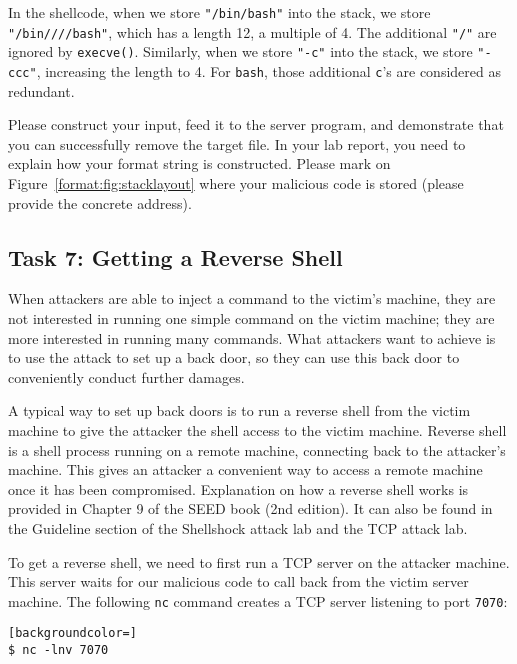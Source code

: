 In the shellcode, when we store \texttt{"/bin/bash"} into the stack, we store 
\texttt{"/bin////bash"}, which has a length 12, a multiple of 4. The additional \texttt{"/"}
are ignored by \texttt{execve()}. Similarly, when we store \texttt{"-c"} into the stack,
we store \texttt{"-ccc"}, increasing the length to 4. For \texttt{bash}, those 
additional \texttt{c}'s are considered as redundant.  


Please construct your input, feed it to the server program, and demonstrate that you can
successfully remove the target file. In your lab report, you need to explain
how your format string is constructed. Please mark on Figure~\ref{format:fig:stacklayout} where 
your malicious code is stored (please provide the concrete address). 


\subsection{Task 7: Getting a Reverse Shell}

When attackers are able to inject a command to the victim's machine, 
they are not interested in running one simple
command on the victim machine; they are more interested in running many
commands. What attackers want to achieve is to use the
attack to set up a back door, so they can use this
back door to conveniently conduct further damages.

A typical way to set up back doors is to run a reverse shell from the
victim machine to give the attacker the shell access to the victim machine.
Reverse shell is a shell process running on a remote machine, connecting
back to the attacker's machine. This gives an attacker a convenient way to
access a remote machine once it has been compromised. Explanation on how a
reverse shell works is provided in Chapter 9 of the SEED book (2nd edition). It can 
also be found in the Guideline section of the Shellshock attack lab 
and the TCP attack lab.


To get a reverse shell, we need to first run a TCP server on the attacker
machine. This server waits for our malicious code to call back from the 
victim server machine. The following \texttt{nc} command creates a TCP
server listening to port \texttt{7070}:  

\begin{lstlisting}[backgroundcolor=]
$ nc -lnv 7070 
\end{lstlisting}


